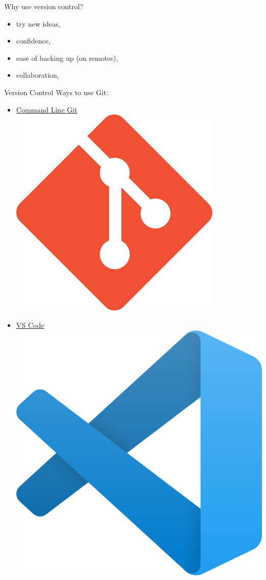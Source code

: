 \documentclass{beamer} %
\begin{document}
  \begin{frame}{Why use version control?}

    \begin{itemize}
      \item try new ideas,
      \item confidence,
      \item ease of backing up (on remotes),
      \item collaboration,
    \end{itemize}
    
  \end{frame}


  \begin{frame}{Version Control}
    Ways to use Git:
    \begin{itemize}
      \item \href{https://git-scm.com/}{Command Line Git \includegraphics[height=.05\textheight]{git}}
      \item \href{https://code.visualstudio.com/}{VS Code \includegraphics[height=.05\textheight]{vscode}}

\end{itemize}
\end{frame}
\end{document}
